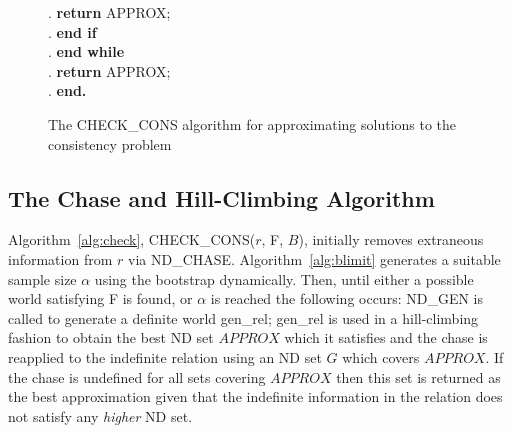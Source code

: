 {\begin{figure}[ht]
\begin{center}
{\begin{minipage}{16cm}
\begin{algorithm}
\begin{rm}
\begin{tabbing}
\sa. \> \> \> \> \> {\bf return} APPROX; \\
\sa. \> \> \> \> {\bf end if} \\
\sa. \> \> \>  {\bf end while} \\
\sa. \> \> \> {\bf return} APPROX; \\
\sa. \> \> {\bf end.}
\end{tabbing}
\end{rm}
\end{algorithm}
\end{minipage}}
\caption{\label{cp:fig:check_cons} The CHECK\_CONS algorithm for
approximating solutions to the consistency problem}
\end{center}
\end{figure}
}


\subsection{The Chase and Hill-Climbing Algorithm}

Algorithm~\ref{alg:check}, CHECK\_CONS($r$, F, $B$), initially removes
extraneous information from $r$ via
ND\_CHASE. Algorithm~\ref{alg:blimit} generates a suitable sample size
$\alpha$ using the bootstrap dynamically. Then, until either a
possible world satisfying F is found, or $\alpha$ is reached the
following occurs: ND\_GEN is called to generate a definite world
gen\_rel; gen\_rel is used in a hill-climbing fashion to obtain the best ND
set $APPROX$ which it satisfies and the chase is reapplied to the indefinite
relation using an ND set $G$ which covers $APPROX$. If the chase is
undefined for all sets covering $APPROX$ then this set is returned as
the best approximation given that the indefinite information in the
relation does not satisfy any {\em higher} ND set. 

\smallskip


